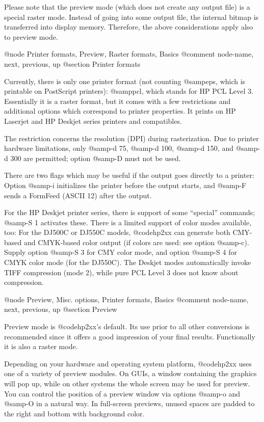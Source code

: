 Please note that the preview mode (which does not create any output file)
is a special raster mode. Instead of going into some output file,
the internal bitmap is transferred into display memory.
Therefore, the above considerations apply also to preview mode.




@node Printer formats, Preview, Raster formats, Basics
@comment  node-name,  next,  previous,  up
@section Printer formats

Currently, there is only one printer format (not counting @samp{eps}, which
is printable on PostScript printers): @samp{pcl}, which stands for HP PCL
Level 3. Essentially it is a raster format, but it comes with a few
restrictions and additional options which correspond to printer properties.
It prints on HP Laserjet and HP Deskjet series printers and compatibles.

The restriction concerns the resolution (DPI) during rasterization. Due to
printer hardware limitations, only @samp{-d 75}, @samp{-d 100}, @samp{-d 150},
and @samp{-d 300} are permitted; option @samp{-D} must not be used.


There are two flags which may be useful if the output goes directly
to a printer: Option @samp{-i} initializes the printer before the
output starts, and @samp{-F} sends a FormFeed (ASCII 12) after the output.

For the HP Deskjet printer series, there is support of some ``special''
commands; @samp{-S 1} activates these. There is a limited support of color
modes available, too: For the DJ500C or DJ550C models, @code{hp2xx} can
generate both CMY-based and CMYK-based color output (if colors are used:
see option @samp{-c}). Supply option @samp{-S 3} for CMY color mode, and
option @samp{-S 4} for CMYK color mode (for the DJ550C). The Deskjet modes
automatically invoke TIFF compression (mode 2), while pure PCL Level 3
does not know about compression.



@node Preview, Misc. options, Printer formats, Basics
@comment  node-name,  next,  previous,  up
@section Preview

Preview mode is @code{hp2xx}'s default. Its use prior to all other
conversions is recommended since it offers a good impression of your
final results. Functionally it is also a raster mode.

Depending on your hardware and operating system platform,
@code{hp2xx} uses one of a variety of preview modules.
On GUIs, a window containing the graphics will pop up, while on other
systems the whole screen may be used for preview. You can control the
position of a preview window via options @samp{-o} and @samp{-O} in
a natural way. In full-screen previews, unused spaces are padded to the
right and bottom with background color.

